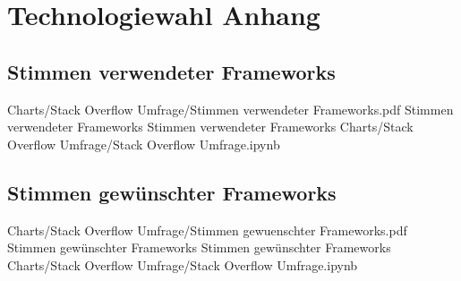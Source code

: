 \chapter{Technologiewahl Anhang} 

\section{Stimmen verwendeter Frameworks} 

\begin{alexfigurewithnotebook}{Charts/Stack Overflow Umfrage/Stimmen verwendeter Frameworks.pdf}
	{Stimmen verwendeter Frameworks}
	{Stimmen verwendeter Frameworks}
	{Charts/Stack Overflow Umfrage/Stack Overflow Umfrage.ipynb}
	{}
	\label{fig:StimmenVerwendeterFrameworks}
\end{alexfigurewithnotebook}

\section{Stimmen gewünschter Frameworks} 


\begin{alexfigurewithnotebook}{Charts/Stack Overflow Umfrage/Stimmen gewuenschter Frameworks.pdf}
	{Stimmen gewünschter Frameworks}
	{Stimmen gewünschter Frameworks}
	{Charts/Stack Overflow Umfrage/Stack Overflow Umfrage.ipynb}
	{}
	\label{fig:StimmenGewuenschterFrameworks}
\end{alexfigurewithnotebook}







